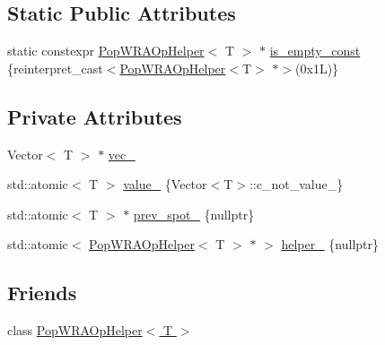 \subsection*{Static Public Attributes}
\begin{DoxyCompactItemize}
\item 
static constexpr \hyperlink{classtervel_1_1containers_1_1wf_1_1vector_1_1_pop_w_r_a_op_helper}{Pop\+W\+R\+A\+Op\+Helper}$<$ T $>$ $\ast$ \hyperlink{classtervel_1_1containers_1_1wf_1_1vector_1_1_pop_w_r_a_op_ab59b382256b993e0bcae4c7a1064f665}{is\+\_\+empty\+\_\+const} \{reinterpret\+\_\+cast$<$\hyperlink{classtervel_1_1containers_1_1wf_1_1vector_1_1_pop_w_r_a_op_helper}{Pop\+W\+R\+A\+Op\+Helper}$<$T$>$ $\ast$$>$(0x1\+L)\}
\end{DoxyCompactItemize}
\subsection*{Private Attributes}
\begin{DoxyCompactItemize}
\item 
Vector$<$ T $>$ $\ast$ \hyperlink{classtervel_1_1containers_1_1wf_1_1vector_1_1_pop_w_r_a_op_ae0e8adc35df23f084d965aadc3f7de1b}{vec\+\_\+}
\item 
std\+::atomic$<$ T $>$ \hyperlink{classtervel_1_1containers_1_1wf_1_1vector_1_1_pop_w_r_a_op_a4b7f4c44861229e9388d0458a52da214}{value\+\_\+} \{Vector$<$T$>$\+::c\+\_\+not\+\_\+value\+\_\+\}
\item 
std\+::atomic$<$ T $>$ $\ast$ \hyperlink{classtervel_1_1containers_1_1wf_1_1vector_1_1_pop_w_r_a_op_af59ca2f59473f47e6bd91eb510a2db84}{prev\+\_\+spot\+\_\+} \{nullptr\}
\item 
std\+::atomic$<$ \hyperlink{classtervel_1_1containers_1_1wf_1_1vector_1_1_pop_w_r_a_op_helper}{Pop\+W\+R\+A\+Op\+Helper}$<$ T $>$ $\ast$ $>$ \hyperlink{classtervel_1_1containers_1_1wf_1_1vector_1_1_pop_w_r_a_op_ae3ba9949906f4848355163a3ca1f6185}{helper\+\_\+} \{nullptr\}
\end{DoxyCompactItemize}
\subsection*{Friends}
\begin{DoxyCompactItemize}
\item 
class \hyperlink{classtervel_1_1containers_1_1wf_1_1vector_1_1_pop_w_r_a_op_a001862caebce5469c52298be5fc100a3}{Pop\+W\+R\+A\+Op\+Helper$<$ T $>$}
\end{DoxyCompactItemize}


